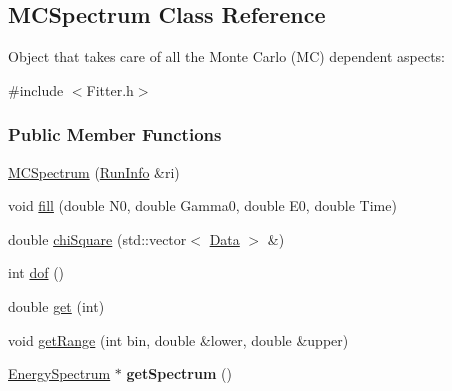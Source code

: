 \hypertarget{classMCSpectrum}{
\subsection{MCSpectrum Class Reference}
\label{classMCSpectrum}
}


Object that takes care of all the Monte Carlo (MC) dependent aspects:  




{\ttfamily \#include $<$Fitter.h$>$}

\subsubsection*{Public Member Functions}
\begin{DoxyCompactItemize}
\item 
\hyperlink{classMCSpectrum_ae7bb310b53fe6faf2fbdb74017c627db}{MCSpectrum} (\hyperlink{classRunInfo}{RunInfo} \&ri)
\item 
\hypertarget{classMCSpectrum_a7e79cfbd1d264d02e46010375e399aca}{
void \hyperlink{classMCSpectrum_a7e79cfbd1d264d02e46010375e399aca}{fill} (double N0, double Gamma0, double E0, double Time)}
\label{classMCSpectrum_a7e79cfbd1d264d02e46010375e399aca}

\item 
\hypertarget{classMCSpectrum_a0777ca61a540ea776229d523ff32b0f4}{
double \hyperlink{classMCSpectrum_a0777ca61a540ea776229d523ff32b0f4}{chiSquare} (std::vector$<$ \hyperlink{structData}{Data} $>$ \&)}
\label{classMCSpectrum_a0777ca61a540ea776229d523ff32b0f4}

\item 
\hypertarget{classMCSpectrum_ad677cf1fbb8de27981202ad6056ebf58}{
int \hyperlink{classMCSpectrum_ad677cf1fbb8de27981202ad6056ebf58}{dof} ()}
\label{classMCSpectrum_ad677cf1fbb8de27981202ad6056ebf58}

\item 
\hypertarget{classMCSpectrum_aadcdac2c8cf36b4c6b76f9c0f7a04d65}{
double \hyperlink{classMCSpectrum_aadcdac2c8cf36b4c6b76f9c0f7a04d65}{get} (int)}
\label{classMCSpectrum_aadcdac2c8cf36b4c6b76f9c0f7a04d65}

\item 
\hypertarget{classMCSpectrum_aea3d956882a19612b53dfabf4a4ee36f}{
void \hyperlink{classMCSpectrum_aea3d956882a19612b53dfabf4a4ee36f}{getRange} (int bin, double \&lower, double \&upper)}
\label{classMCSpectrum_aea3d956882a19612b53dfabf4a4ee36f}

\item 
\hypertarget{classMCSpectrum_aff6aa85d0e2a5006caf0b194ec53dae1}{
\hyperlink{classEnergySpectrum}{EnergySpectrum} $\ast$ {\bfseries getSpectrum} ()}
\label{classMCSpectrum_aff6aa85d0e2a5006caf0b194ec53dae1}


\end{DoxyCompactItemize}

